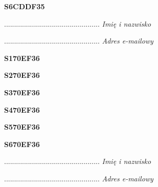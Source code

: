 \begin{turn}{90}\huge \textbf{S6CDDF35}\end{turn}

\begin{turn}{90}\begin{minipage}{\linewidth} \vspace{20mm} ................................................  \textit{Imię i nazwisko}\end{minipage}\end{turn}

\begin{turn}{90}\begin{minipage}{\linewidth} \vspace{20mm} ................................................  \textit{Adres e-mailowy}\end{minipage}\end{turn}

\begin{turn}{90}\huge \textbf{S170EF36}\end{turn}

\begin{turn}{90}\huge \textbf{S270EF36}\end{turn}

\begin{turn}{90}\huge \textbf{S370EF36}\end{turn}

\begin{turn}{90}\huge \textbf{S470EF36}\end{turn}

\begin{turn}{90}\huge \textbf{S570EF36}\end{turn}

\begin{turn}{90}\huge \textbf{S670EF36}\end{turn}

\begin{turn}{90}\begin{minipage}{\linewidth} \vspace{20mm} ................................................  \textit{Imię i nazwisko}\end{minipage}\end{turn}

\begin{turn}{90}\begin{minipage}{\linewidth} \vspace{20mm} ................................................  \textit{Adres e-mailowy}\end{minipage}\end{turn}

